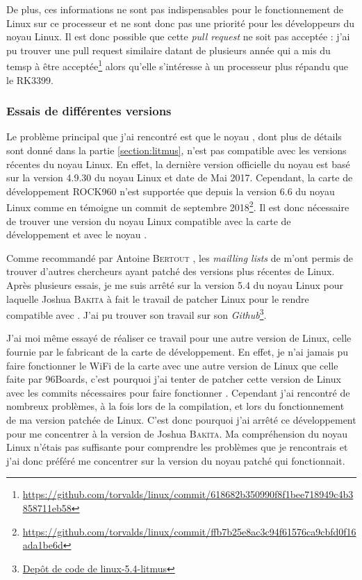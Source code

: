 De plus, ces informations ne sont pas indispensables pour le fonctionnement de Linux sur ce processeur et ne sont donc pas une priorité pour les développeurs du noyau Linux. Il est donc possible que cette \textit{pull request} ne soit pas acceptée : j'ai pu trouver une pull request similaire datant de plusieurs année qui a mis du temsp à être acceptée\footnote{\href{https://github.com/torvalds/linux/commit/618682b350990f8f1bee718949c4b3858711eb58}{https://github.com/torvalds/linux/commit/618682b350990f8f1bee718949c4b3858711eb58}} alors qu'elle s'intéresse à un processeur plus répandu que le RK3399.


\subsubsection{Essais de différentes versions}

Le problème principal que j'ai rencontré est que le noyau \litmus, dont plus de détails sont donné dans la partie \ref{section:litmus}, n'est pas compatible avec les versions récentes du noyau Linux. En effet, la dernière version officielle du noyau \litmus est basé sur la version 4.9.30 du noyau Linux et date de Mai 2017. Cependant, la carte de développement ROCK960 n'est supportée que depuis la version 6.6 du noyau Linux comme en témoigne un commit de septembre 2018\footnote{\href{https://github.com/torvalds/linux/commit/ffb7b25e8ac3c94f61576ca9cbfd0f16ada1be6d}{https://github.com/torvalds/linux/commit/ffb7b25e8ac3c94f61576ca9cbfd0f16ada1be6d}}. Il est donc nécessaire de trouver une version du noyau Linux compatible avec la carte de développement et avec le noyau \litmus.

Comme recommandé par Antoine \textsc{Bertout} , les \textit{mailling lists} de \litmus m'ont permis de trouver d'autres chercheurs ayant patché des versions plus récentes de Linux. Après plusieurs essais, je me suis arrêté sur la version 5.4 du noyau Linux pour laquelle Joshua \textsc{Bakita} à fait le travail de patcher Linux pour le rendre compatible avec \litmus. J'ai pu trouver son travail sur son \textit{Github}\footnote{\href{https://github.com/JoshuaJB/litmus-rt/tree/linux-5.4-litmus}{Depôt de code de linux-5.4-litmus}}. 

J'ai moi même essayé de réaliser ce travail pour une autre version de Linux, celle fournie par le fabricant de la carte de développement. En effet, je n'ai jamais pu faire fonctionner le WiFi de la carte avec une autre version de Linux que celle faite par 96Boards, c'est pourquoi j'ai tenter de patcher cette version de Linux avec les commits nécessaires pour faire fonctionner \litmus. Cependant j'ai rencontré de nombreux problèmes, à la fois lors de la compilation, et lors du fonctionnement de ma version patchée de Linux. C'est donc pourquoi j'ai arrêté ce développement pour me concentrer à la version de Joshua \textsc{Bakita}. Ma compréhension du noyau Linux n'étais pas suffisante pour comprendre les problèmes que je rencontrais et j'ai donc préféré me concentrer sur la version du noyau patché qui fonctionnait.

